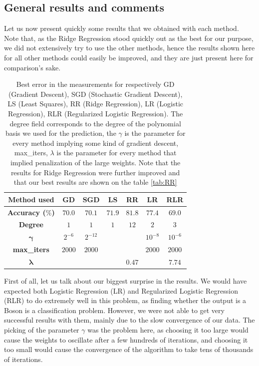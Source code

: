 \documentclass[10pt,conference,compsocconf]{IEEEtran}
\begin{document}
\subsection{General results and comments}
Let us now present quickly some results that we obtained with each method. Note that, as the Ridge Regression stood quickly out as the best for our purpose, we did not extensively try to use the other methods, hence the results shown here for all other methods could easily be improved, and they are just present here for comparison's sake.
\begin{table}[!h]
	\centering
	\begin{tabular}{c||c|c|c|c|c|c}
		\textbf{Method used} & GD & SGD & LS & RR & LR & RLR  \\
		\hline
		\textbf{Accuracy ($\%$)} & $70.0$&$70.1$&$71.9$&$81.8$&$77.4$&$69.0$\\
		\hline
		\textbf{Degree} & $1$ &$1$&$1$&$12$&$2$&$3$\\
		\hline
		$\mathbf{\gamma}$ & $2^{-6}$&$2^{-12}$&\diagbox{}&\diagbox{}&$10^{-8}$&$10^{-6}$\\
		\hline
		\textbf{max\_iters} & $2000$&$2000$&\diagbox{}&\diagbox{}&$2000$&$2000$\\
		\hline
		$\mathbf{\lambda}$ & \diagbox{}&\diagbox{}&\diagbox{}&$0.47$&\diagbox{}&$7.74$\\	
	\end{tabular}
	
	\caption{Best error in the measurements for respectively GD (Gradient Descent), SGD (Stochastic Gradient Descent), LS (Least Squares), RR (Ridge Regression), LR (Logistic Regression), RLR (Regularized Logistic Regression). The degree field corresponds to the degree of the polynomial basis we used for the prediction, the $\gamma$ is the parameter for every method implying some kind of gradient descent, max\_iters, $\lambda$ is the parameter for every method that implied penalization of the large weights. Note that the results for Ridge Regression were further improved and that our best results are shown on the table \ref{tab:RR}}
	\label{tab:results}
\end{table}

First of all, let us talk about our biggest surprise in the results. We would have expected both Logistic Regression (LR) and Regularized Logistic Regression (RLR) to do extremely well in this problem, as finding whether the output is a Boson is a classification problem. However, we were not able to get very successful results with them, mainly due to the slow convergence of our data. The picking of the parameter $\gamma$ was the problem here, as choosing it too large would cause the weights to oscillate after a few hundreds of iterations, and choosing it too small would cause the convergence of the algorithm to take tens of thousands of iterations. 
\end{document}
